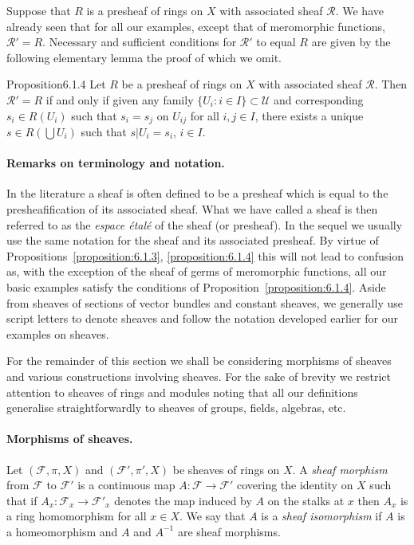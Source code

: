 Suppose that $R$ is a presheaf of rings on $X$ with associated sheaf $\mathcal R$. We have already seen that for all our examples, except that of meromorphic functions, $\mathcal R'=R$. Necessary and sufficient conditions for $\mathcal R'$ to equal $R$ are given by the following elementary lemma the proof of which we omit.

\begin{originaltheorem}{Proposition}{6.1.4}
Let $R$ be a presheaf of rings on $X$ with associated sheaf $\mathcal R$. Then $\mathcal R'=R$ if and only if given any family $\{U_i:i\in I\}\subset\mathcal U$ and corresponding $s_i\in R(U_i)$ such that $s_i=s_j$ on $U_{ij}$ for all $i,j\in I$, there exists a unique $s\in R(\bigcup U_i)$ such that $s|U_i=s_i$, $i\in I$.
\end{originaltheorem}
\paragraph{Remarks on terminology and notation.}
In the literature a sheaf is often defined to be a presheaf which is equal to the presheafification of its associated sheaf. What we have called a sheaf is then referred to as the \emph{espace \'etal\'e} of the sheaf (or presheaf). In the sequel we usually use the same notation for the sheaf and its associated presheaf. By virtue of Propositions~\ref{proposition:6.1.3}, \ref{proposition:6.1.4} this will not lead to confusion as, with the exception of the sheaf of germs of meromorphic functions, all
our basic examples satisfy the conditions of Proposition~\ref{proposition:6.1.4}. Aside from sheaves of sections of vector bundles and constant sheaves, we generally use script letters to denote sheaves and follow the notation developed earlier for our examples on sheaves.

For the remainder of this section we shall be considering morphisms of sheaves and various constructions involving sheaves. For the sake of brevity we restrict attention to sheaves of rings and modules noting that all our definitions generalise straightforwardly to sheaves of groups, fields, algebras, etc.

\paragraph{Morphisms of sheaves.}
Let $(\mathcal F,\pi,X)$ and $(\mathcal F',\pi',X)$ be sheaves of rings on $X$. A \emph{sheaf morphism} from $\mathcal F$ to $\mathcal F'$ is a continuous map $A:\mathcal F\to\mathcal F'$ covering the identity on $X$ such that if $A_x:\mathcal F_x\to\mathcal F'_x$ denotes the map induced by $A$ on the stalks at $x$ then $A_x$ is a ring homomorphism for all $x\in X$. We say that $A$ is a \emph{sheaf isomorphism} if $A$ is a homeomorphism and $A$ and $A^{-1}$ are sheaf morphisms.

